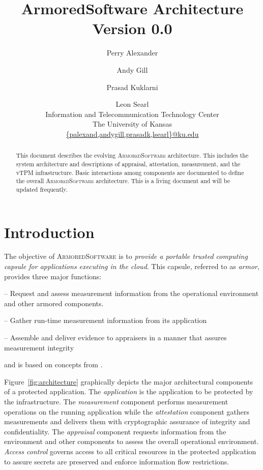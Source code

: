 \documentclass[10pt]{article}
\title{ArmoredSoftware Architecture Version 0.0}
\author{Perry Alexander \and Andy Gill \and Prasad Kuklarni \and Leon
  Searl \\
Information and Telecommunication Technology Center \\
The University of Kansas \\
\url{{palexand,andygill,prasadk,lsearl}@ku.edu}}
\begin{document}
\maketitle
\tableofcontents
\listoffigures

\begin{abstract}
  This document describes the evolving \textsc{ArmoredSoftware}
  architecture.  This includes the system architecture and
  descriptions of appraisal, attestation, measurement, and the vTPM
  infrastructure.  Basic interactions among components are documented
  to define the overall \textsc{ArmoredSoftware} architecture.  This
  is a living document and will be updated frequently.
\end{abstract}

\section{Introduction}

The objective of \textsc{ArmoredSoftware} is to \emph{provide a portable
trusted computing capsule for applications executing in the cloud}.
This capsule, referred to as \emph{armor}, provides three major
functions:

\begin{description}
  \parskip=0pt\itemsep=0pt
\item[Appraisal] -- Request and assess measurement information from
  the operational environment and other armored components.
\item[Measurement] -- Gather run-time measurement information from its
  application
\item[Attestation] -- Assemble and deliver evidence to appraisers in a
  manner that assures measurement integrity
\end{description}

\noindent and is based on concepts from \citet{Coker::Principles-of-R}. 

Figure~\ref{fig:architecture} graphically depicts the major
architectural components of a protected application.  The
\emph{application} is the application to be protected by the
infrastructure.  The \emph{measurement} component performs measurement
operations on the running application while the \emph{attestation}
component gathers measurements and delivers them with cryptographic
assurance of integrity and confidentiality.  The \emph{appraisal}
component requests information from the environment and other
components to assess the overall operational environment.
\emph{Access control} governs access to all critical resources in the
protected application to assure secrets are preserved and enforce
information flow restrictions.
\end{document}

